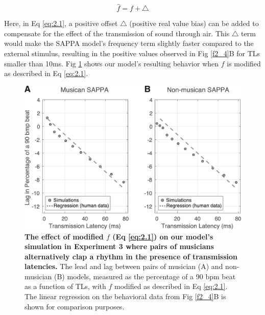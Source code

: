 \documentclass{report}
\begin{document}
\begin{equation}
\hat{f} = f + \triangle \label{eq:2.1}
\end{equation}

Here, in Eq \eqref{eq:2.1}, a positive offset $\triangle$ (positive real value bias) can be added to compensate for the effect of the transmission of sound through air. This $\triangle$ term would make the SAPPA model's frequency term slightly faster compared to the external stimulus, resulting in the positive values observed in Fig \ref{f2_4}B for TLs smaller than 10ms. Fig \ref{f2_5} shows our model's resulting behavior when $f$ is modified as described in Eq \eqref{eq:2.1}.

\begin{figure}
    \centering
    \includegraphics[width=1.0\textwidth]{figures/fig2_5.png}
    \caption[The effect of modified $f$ (Eq \eqref{eq:2.1}) on our model's simulation in Experiment 3 where pairs of musicians alternatively clap a rhythm in the presence of transmission latencies]{\textbf{The effect of modified $f$ (Eq \eqref{eq:2.1}) on our model's simulation in Experiment 3 where pairs of musicians alternatively clap a rhythm in the presence of transmission latencies.} The lead and lag between pairs of musician (A) and non-musician (B) models, measured as the percentage of a 90 bpm beat as a function of TLs, with $f$ modified as described in Eq \eqref{eq:2.1}. The linear regression on the behavioral data from Fig \ref{f2_4}B is shown for comparison purposes.} 
    \label{f2_5}
\end{figure}
\end{document}
